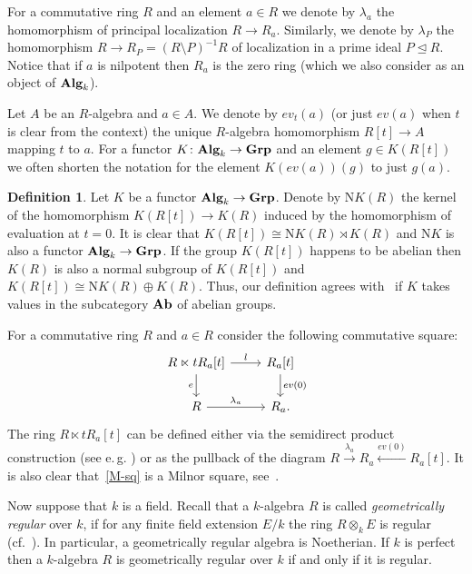 \documentclass[oneside, 11pt]{amsart}
\numberwithin{equation}{section}
\theoremstyle{definition}
\newtheorem{definition}[lemma]{Definition} \Crefname{definition}{Definition}{Definitions}
\theoremstyle{definition}
\theoremstyle{remark}
\newcommand{\catname}[1]{{\normalfont\textbf{#1}}} %
\begin{document}
For a commutative ring $R$ and an element $a\in R$ we denote by $\lambda_a$ the homomorphism of principal localization $R \to R_a$. Similarly, we denote by $\lambda_P$ the homomorphism $R \to R_P = (R\setminus P)^{-1}R$ of localization in a prime ideal $P \trianglelefteq R$. Notice that if $a$ is nilpotent then $R_a$ is the zero ring (which we also consider as an object of $\catname{Alg}_k$). 

Let $A$ be an $R$-algebra and $a \in A$. We denote by $ev_t(a)$ (or just $ev(a)$ when $t$ is clear from the context) the unique $R$-algebra homomorphism $R[t] \to A$ mapping $t$ to $a$. For a functor $K \colon \catname{Alg}_k \to \catname{Grp}$ and an element $g \in K(R[t])$ we often shorten the notation for the element $K(ev(a))(g)$ to just $g(a)$.

\begin{definition}\label{df:NK}
Let $K$ be a functor $\catname{Alg}_k \to \catname{Grp}$.
Denote by $\mathrm NK(R)$ the kernel of the homomorphism $K(R[t]) \to K(R)$ induced by the homomorphism of evaluation at $t=0$. It is clear that $K(R[t]) \cong \mathrm NK(R) \rtimes K(R)$ and $\mathrm NK$ is also a functor $\catname{Alg}_k \to \catname{Grp}$. If the group $K(R[t])$ happens to be abelian then $K(R)$ is also a normal subgroup of $K(R[t])$ and $K(R[t]) \cong \mathrm NK(R) \oplus K(R)$. Thus, our definition agrees with~\cite[Def.~III.3.3]{Kbook} if $K$ takes values in the subcategory $\catname{Ab}$ of abelian groups.
\end{definition}

For a commutative ring $R$ and $a \in R$ consider the following commutative square:
  \begin{equation} \label{M-sq} \begin{tikzcd} R \ltimes t R_a[t] \ar{r}{l} \ar{d}[swap]{e} & R_a[t] \ar{d}{ev(0)} \\ R \ar{r}{\lambda_a} & R_a. \end{tikzcd}\end{equation}
  The ring $R \ltimes tR_a[t]$ can be defined either via the semidirect product construction (see e.\,g. \cite[Definition~3.2]{S15}) or as the pullback of the diagram  $R \xrightarrow{\lambda_a} R_a \xleftarrow{ev(0)} R_a[t]$.
  It is also clear that~\eqref{M-sq} is a Milnor square, see~\cite[Example~I.2.6]{Kbook}.

Now suppose that $k$ is a field. Recall that a $k$-algebra $R$ is called {\it geometrically regular} over $k$, if for any finite field extension $E/k$ the ring $R\otimes_kE$ is regular (cf.~\cite[p.~137]{Sw98}). In particular, a geometrically regular algebra is Noetherian. If $k$ is perfect then a $k$-algebra $R$ is geometrically regular over $k$ if and only if it is regular.
\end{document}
